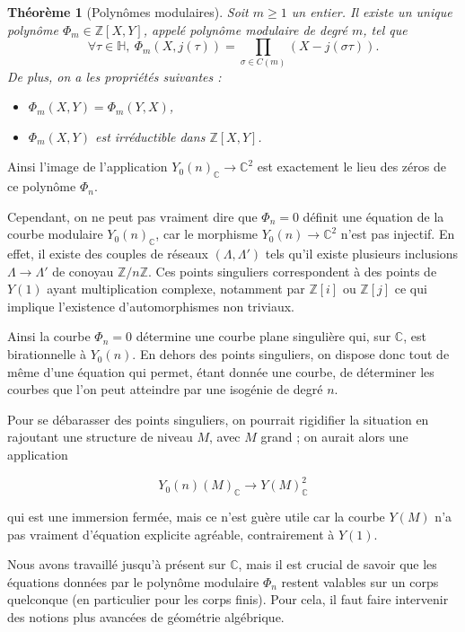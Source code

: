 \documentclass[11pt,a4paper]{article}
\newcommand{\Z}{\mathbb{Z}}
\newcommand{\C}{\mathbb{C}}
\renewcommand{\H}{\mathbb{H}}
\newcommand{\vers}{\rightarrow}
\newtheorem*{thm}{Théorème}
\theoremstyle{definition}
\begin{document}
\begin{thm}[Polynômes modulaires]

Soit $m\geq 1$ un entier. Il existe un unique  polynôme $\Phi_m \in \Z[X,Y]$, appelé \emph{polynôme modulaire} de degré $m$, tel que
$$\forall \tau\in\H,\ \Phi_m(X,j(\tau))=\prod_{\sigma\in C(m)} (X-j(\sigma\tau)).$$
De plus, on a les propriétés suivantes :

\begin{itemize}
\item[(i)] $\Phi_m(X,Y)=\Phi_m(Y,X)$,
\item[(ii)] $\Phi_m(X,Y)$ est irréductible dans $\Z[X,Y]$.
\end{itemize}

\end{thm}

Ainsi l'image de l'application $Y_0(n)_\C\vers \C^2$ est exactement le lieu des zéros de ce polynôme $\Phi_n$.

Cependant, on ne peut pas vraiment dire que $\Phi_n=0$ définit une équation de la courbe modulaire $Y_0(n)_\C$, car le morphisme $Y_0(n)\vers \C^2$ n'est pas injectif. En effet, il existe des couples de réseaux $(\Lambda, \Lambda')$ tels qu'il existe plusieurs inclusions $\Lambda\vers\Lambda'$ de conoyau $\Z/n\Z$. Ces points singuliers correspondent à des points de $Y(1)$ ayant multiplication complexe, notamment par $\Z[i]$ ou $\Z[j]$ ce qui implique l'existence d'automorphismes non triviaux.

Ainsi la courbe $\Phi_n=0$ détermine une courbe plane singulière qui, sur $\C$, est birationnelle à $Y_0(n)$. En dehors des points singuliers, on dispose donc tout de même d'une équation qui permet, étant donnée une courbe, de déterminer les courbes que l'on peut atteindre par une isogénie de degré $n$.

Pour se débarasser des points singuliers, on pourrait rigidifier la situation en rajoutant une structure de niveau $M$, avec $M$ grand ; on aurait alors une application

$$Y_0(n)(M)_\C\vers Y(M)_\C^2$$

qui est une immersion fermée, mais ce n'est guère utile car la courbe $Y(M)$ n'a pas vraiment d'équation explicite agréable, contrairement à $Y(1)$.

Nous avons travaillé jusqu'à présent sur $\C$, mais il est crucial de savoir que les équations données par le polynôme modulaire $\Phi_n$ restent valables sur un corps quelconque (en particulier pour les corps finis). Pour cela, il faut faire intervenir des notions plus avancées de géométrie algébrique.
\end{document}
